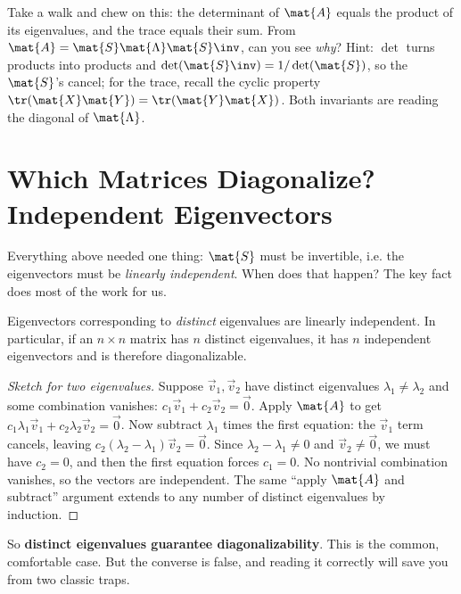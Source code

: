 \begin{walkbox}
Take a walk and chew on this: the determinant of $\mat{A}$ equals the product of
its eigenvalues, and the trace equals their sum. From $\mat{A} =
\mat{S}\mat{\Lambda}\mat{S}\inv$, can you see \emph{why}? Hint: $\det$ turns
products into products and $\det(\mat{S}\inv)=1/\det(\mat{S})$, so the $\mat{S}$'s
cancel; for the trace, recall the cyclic property $\tr(\mat{X}\mat{Y}) =
\tr(\mat{Y}\mat{X})$. Both invariants are reading the diagonal of
$\mat{\Lambda}$.
\end{walkbox}

\section{Which Matrices Diagonalize? Independent Eigenvectors}
\label{ch24:which}

Everything above needed one thing: $\mat{S}$ must be invertible, i.e. the
eigenvectors must be \emph{linearly independent}. When does that happen? The key
fact does most of the work for us.

\begin{theorem}
\label{ch24:thm-distinct}
Eigenvectors corresponding to \emph{distinct} eigenvalues are linearly
independent. In particular, if an $n\times n$ matrix has $n$ distinct
eigenvalues, it has $n$ independent eigenvectors and is therefore
diagonalizable.
\end{theorem}

\begin{proof}[Sketch for two eigenvalues]
Suppose $\vec{v}_1,\vec{v}_2$ have distinct eigenvalues $\lambda_1\neq\lambda_2$
and some combination vanishes: $c_1\vec{v}_1 + c_2\vec{v}_2 = \vec0$. Apply
$\mat{A}$ to get $c_1\lambda_1\vec{v}_1 + c_2\lambda_2\vec{v}_2 = \vec0$. Now
subtract $\lambda_1$ times the first equation: the $\vec{v}_1$ term cancels,
leaving $c_2(\lambda_2 - \lambda_1)\vec{v}_2 = \vec0$. Since
$\lambda_2-\lambda_1\neq0$ and $\vec{v}_2\neq\vec0$, we must have $c_2 = 0$, and
then the first equation forces $c_1 = 0$. No nontrivial combination vanishes, so
the vectors are independent. The same ``apply $\mat{A}$ and subtract'' argument
extends to any number of distinct eigenvalues by induction.
\end{proof}

So \textbf{distinct eigenvalues guarantee diagonalizability}. This is the common,
comfortable case. But the converse is false, and reading it correctly will save
you from two classic traps.

